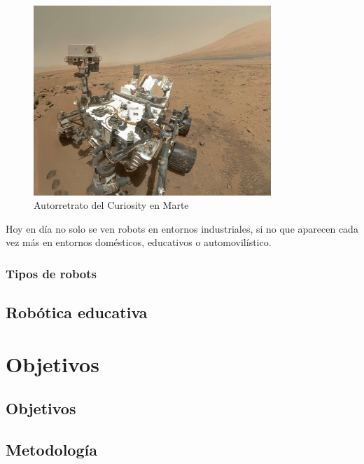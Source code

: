 \begin{figure}[H]
\centering
\includegraphics[width=0.8\textwidth]{img/curiosity.jpg}
\caption{Autorretrato del Curiosity en Marte} \label{fig:curiosity}
\end{figure}


Hoy en día no solo se ven robots en entornos industriales, si no que aparecen cada vez más en entornos domésticos, educativos o automovilístico.

\subsection{Tipos de robots}
\label{subsec:tiposRobots}


\section{Robótica educativa}
\label{sec:educativa}

\chapter{Objetivos}
\label{chap:objetives}
\section{Objetivos}
\section{Metodología}
